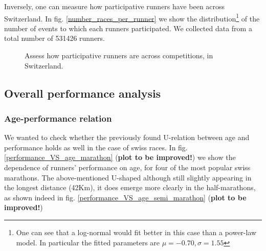 \documentclass[fleqn,10pt]{wlscirep}
\begin{document}
 	Inversely, one can measure how participative runners have been across Switzerland. 
 	In fig. \ref{number_races_per_runner} we show the distribution\footnote{		One can see that a log-normal would fit better in this case than a power-law model. In particular the fitted parameters are $ \mu = -0.70, \sigma  = 1.55 $} of  the number of events to which each runners participated. We collected data from  a total number of 531426 runners.
 	
 	
 	
 	\begin{figure}[h]	
 		\centering
 		
 		
 		\caption{Assess how participative runners are across competitions, in Switzerland.}
 	\end{figure}						 		
	
	
	\subsection*{Overall performance analysis}
	
		\subsubsection*{Age-performance relation}
		
		
			We wanted to check whether the previously found	\cite{connick2015relative,knechtle2014relationship,lara2014relationship,lehto2016effects}
			U-relation between age and performance holds as well in the case of swiss races. 
			In fig. \ref{performance_VS_age_marathon} 
			(\textbf{plot to be improved!}) 
			we show the dependence of runners' performance on age, for four of the most popular swiss marathons. 
			The above-mentioned U-shaped although still slightly appearing in the longest distance (42Km), it does emerge more clearly in the half-marathons, as  shown indeed in fig. \ref{performance_VS_age_semi_marathon}
			(\textbf{plot to be improved!}) 
			
\end{document}
